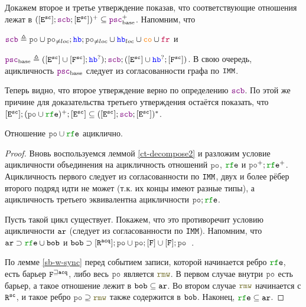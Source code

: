 Докажем второе и третье утверждение показав, что соответствующие отношения лежат в $([\lE^\sco] ; \lSCB ; [\lE^\sco])^{+} \subseteq \lPSCB^{+}$. Напомним, что

$\lSCB \defeq \lPO \cup \lPO_{\neq loc} ; \lHB ; \lPO_{\neq loc} \cup \lHB_{loc} \cup \lCO \cup \lFR$ и

$\lPSCB \defeq ([\lE^\sco] \cup [\lF^\sco];\lHB^?);\lSCB;([\lE^\sco] \cup{} \lHB^?;[\lF^\sco])$. В свою очередь, ацикличность $\lPSCB$ следует из согласованности графа по $\mathtt{IMM}$. 

Теперь видно, что второе утверждение верно по определению $\lSCB$. По этой же причине для доказательства третьего утверждения остаётся показать, что $[\lE^{\sco}];(\lPO \cup \lRFE)^{+} ; [\lE^{\sco}] \subseteq ([\lE^\sco] ; \lSCB ; [\lE^\sco])^{*}$. 


\begin{thrm} \label{acyclic-po-rfe}
Отношение $\lPO \cup \lRFE$ ациклично.
\end{thrm}
\begin{proof}
Вновь воспользуемся леммой \ref{ct-decompose2} и разложим условие ацикличности объединения на ацикличность отношений $\lPO$, $\lRFE$ и $\lPO^{+} ; \lRFE^{+}$. Ацикличность первого следует из согласованности по $\mathtt{IMM}$, двух и более рёбер второго подряд идти не может (т.к. их концы имеют разные типы), а ацикличность третьего эквивалентна ацикличности $\lPO ; \lRFE$. 

  Пусть такой цикл существует. Покажем, что это противоречит условию ацикличности $\lAR$ (следует из согласованности по $\mathtt{IMM}$). Напомним, что $\lAR \supset \lRFE \cup \lBOB$ и $\lBOB \supset [\lR^{\acq}] ; \lPO \cup \lPO ; [\lF] \cup [\lF] ; \lPO$\ .

  По лемме \ref{sb-w-sync} перед событием записи, которой начинается ребро $\lRFE$, есть барьер ${\mathtt{F}}^{\sqsupseteq {\mathtt{acq}}}$, либо весь $\lPO$ является $\lRMW$. В первом случае внутри $\lPO$ есть барьер, а такое отношение лежит в $\lBOB \subseteq \lAR$. Во втором случае $\lRMW$ начинается с ${\mathtt{R}}^{{\mathtt{sc}}}$, и такое ребро $\lPO \supseteq \lRMW$ также содержится в ${\mathtt{bob}}$. Наконец, $\lRFE \subseteq \lAR$. 
\end{proof}

